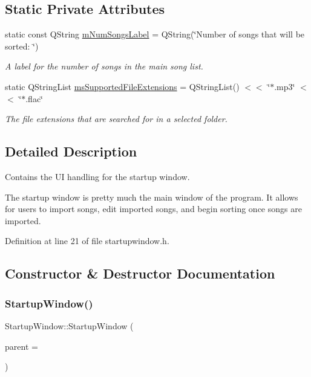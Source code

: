 \subsection*{Static Private Attributes}
\begin{DoxyCompactItemize}
\item 
static const Q\+String \mbox{\hyperlink{class_startup_window_a59337faf9ce34917d0e056414601c571}{m\+Num\+Songs\+Label}} = Q\+String(\char`\"{}Number of songs that will be sorted\+: \char`\"{})
\begin{DoxyCompactList}\small\item\em A label for the number of songs in the main song list. \end{DoxyCompactList}\item 
static Q\+String\+List \mbox{\hyperlink{class_startup_window_a7caf611224e692a7116cba45f1aa71a3}{ms\+Supported\+File\+Extensions}} = Q\+String\+List() $<$$<$ \char`\"{}$\ast$.mp3\char`\"{} $<$$<$ \char`\"{}$\ast$.flac\char`\"{}
\begin{DoxyCompactList}\small\item\em The file extensions that are searched for in a selected folder. \end{DoxyCompactList}\end{DoxyCompactItemize}


\subsection{Detailed Description}
Contains the UI handling for the startup window.

The startup window is pretty much the main window of the program. It allows for users to import songs, edit imported songs, and begin sorting once songs are imported. 

Definition at line 21 of file startupwindow.\+h.



\subsection{Constructor \& Destructor Documentation}
\mbox{\label{class_startup_window_a5aac41515d35e1306d8ac0890f3de174}} 
\subsubsection{\texorpdfstring{Startup\+Window()}{StartupWindow()}}
{\footnotesize\ttfamily Startup\+Window\+::\+Startup\+Window (\begin{DoxyParamCaption}\item[{Q\+Widget $\ast$}]{parent = {} }\end{DoxyParamCaption})\hspace{0.3cm}{\ttfamily [explicit]}}



